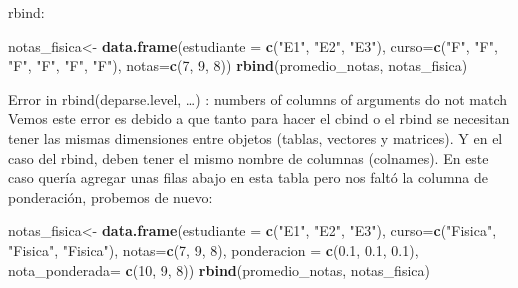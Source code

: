 \documentclass[
]{book}
\newenvironment{Shaded}{\begin{snugshade}}{\end{snugshade}}
\newcommand{\AttributeTok}[1]{\textcolor[rgb]{0.13,0.29,0.53}{#1}}
\newcommand{\DecValTok}[1]{\textcolor[rgb]{0.00,0.00,0.81}{#1}}
\newcommand{\FloatTok}[1]{\textcolor[rgb]{0.00,0.00,0.81}{#1}}
\newcommand{\FunctionTok}[1]{\textcolor[rgb]{0.13,0.29,0.53}{\textbf{#1}}}
\newcommand{\NormalTok}[1]{#1}
\newcommand{\OtherTok}[1]{\textcolor[rgb]{0.56,0.35,0.01}{#1}}
\newcommand{\StringTok}[1]{\textcolor[rgb]{0.31,0.60,0.02}{#1}}
\begin{document}
rbind:

\begin{Shaded}
\begin{Highlighting}[]
\NormalTok{notas\_fisica}\OtherTok{\textless{}{-}} \FunctionTok{data.frame}\NormalTok{(}\AttributeTok{estudiante =} \FunctionTok{c}\NormalTok{(}\StringTok{"E1"}\NormalTok{, }\StringTok{"E2"}\NormalTok{, }\StringTok{"E3"}\NormalTok{),}
                            \AttributeTok{curso=}\FunctionTok{c}\NormalTok{(}\StringTok{"F"}\NormalTok{, }\StringTok{"F"}\NormalTok{, }\StringTok{"F"}\NormalTok{, }\StringTok{"F"}\NormalTok{, }\StringTok{"F"}\NormalTok{, }\StringTok{"F"}\NormalTok{),}
                             \AttributeTok{notas=}\FunctionTok{c}\NormalTok{(}\DecValTok{7}\NormalTok{, }\DecValTok{9}\NormalTok{, }\DecValTok{8}\NormalTok{))}
\FunctionTok{rbind}\NormalTok{(promedio\_notas, notas\_fisica)}
\end{Highlighting}
\end{Shaded}

Error in rbind(deparse.level, \ldots) : numbers of columns of arguments do not match\\
Vemos este error es debido a que tanto para hacer el cbind o el rbind se necesitan tener las mismas dimensiones entre objetos (tablas, vectores y matrices).
Y en el caso del rbind, deben tener el mismo nombre de columnas (colnames).
En este caso quería agregar unas filas abajo en esta tabla pero nos faltó la columna de ponderación, probemos de nuevo:\\

\begin{Shaded}
\begin{Highlighting}[]
\NormalTok{notas\_fisica}\OtherTok{\textless{}{-}} \FunctionTok{data.frame}\NormalTok{(}\AttributeTok{estudiante =} \FunctionTok{c}\NormalTok{(}\StringTok{"E1"}\NormalTok{, }\StringTok{"E2"}\NormalTok{, }\StringTok{"E3"}\NormalTok{),}
                            \AttributeTok{curso=}\FunctionTok{c}\NormalTok{(}\StringTok{"Fisica"}\NormalTok{, }\StringTok{"Fisica"}\NormalTok{, }\StringTok{"Fisica"}\NormalTok{),}
                             \AttributeTok{notas=}\FunctionTok{c}\NormalTok{(}\DecValTok{7}\NormalTok{, }\DecValTok{9}\NormalTok{, }\DecValTok{8}\NormalTok{),}
                            \AttributeTok{ponderacion =} \FunctionTok{c}\NormalTok{(}\FloatTok{0.1}\NormalTok{, }\FloatTok{0.1}\NormalTok{, }\FloatTok{0.1}\NormalTok{), }
                          \AttributeTok{nota\_ponderada=} \FunctionTok{c}\NormalTok{(}\DecValTok{10}\NormalTok{, }\DecValTok{9}\NormalTok{, }\DecValTok{8}\NormalTok{))}
\FunctionTok{rbind}\NormalTok{(promedio\_notas, notas\_fisica)}
\end{Highlighting}
\end{Shaded}
\end{document}
